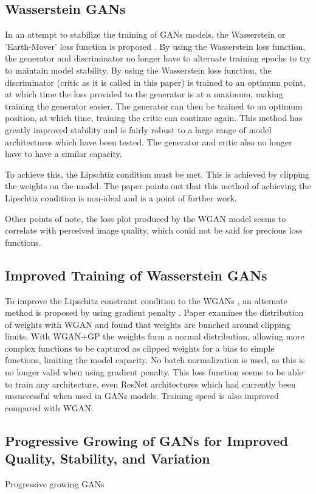 \documentclass[12pt]{article}
\begin{document}
\subsection{Wasserstein GANs}
In an attempt to stabilize the training of GANs models, the Wasserstein or 'Earth-Mover' loss function is proposed \cite{Arjovsky2017}.
By using the Wasserstein loss function, the generator and discriminator no longer have to alternate training epochs to try to maintain model stability.
By using the Wasserstein loss function, the discriminator (critic as it is called in this paper) is trained to an optimum point, at which time the loss provided to the generator is at a maximum, making training the generator easier.
The generator can then be trained to an optimum position, at which time, training the critic can continue again.
This method has greatly improved stability and is fairly robust to a large range of model architectures which have been tested.
The generator and critic also no longer have to have a similar capacity.

To achieve this, the Lipschtiz condition must be met.
This is achieved by clipping the weights on the model.
The paper points out that this method of achieving the Lipschtiz condition is non-ideal and is a point of further work.

Other points of note, the loss plot produced by the WGAN model seems to correlate with perceived image quality, which could not be said for precious loss functions.

\subsection{Improved Training of Wasserstein GANs}
To improve the Lipschitz constraint condition to the WGANs \cite{Arjovsky2017}, an alternate method is proposed by using gradient penalty \cite{Gulrajani2017}.
Paper examines the distribution of weights with WGAN and found that weights are bunched around clipping limits.
With WGAN+GP the weights form a normal distribution, allowing more complex functions to be captured as clipped weights for a bias to simple functions, limiting the model capacity.
No batch normalization is used, as this is no longer valid when using gradient penalty.
This loss function seems to be able to train any architecture, even ResNet architectures which had currently been unsuccessful when used in GANs models.
Training speed is also improved compared with WGAN.

\subsection{Progressive Growing of GANs for Improved Quality, Stability, and Variation}
Progressive growing GANs \cite{Karras2017b}
\end{document}
